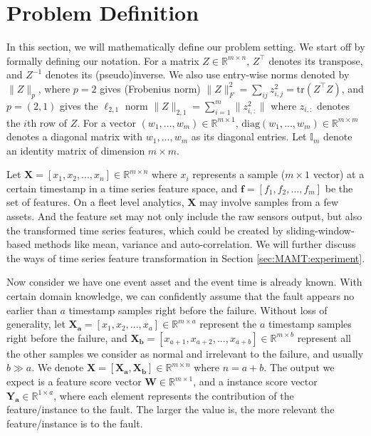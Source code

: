 \section{Problem Definition}
\label{sec:MAMT:prb_def}

In this section, we will mathematically define our problem setting.  
We start off by formally defining our notation. 
For a matrix $Z \in \mathbb{R}^{m \times n}$, $Z^\top$ denotes its transpose, and $Z^{-1}$ denotes its (pseudo)inverse. 
We also use entry-wise norms denoted by $\|Z\|_p$, where $p=2$ gives (Frobenius norm) $\| Z \|_F^2 = \sum_{ij}z^2_{i,j} = \mathrm{tr}(Z^\top Z)$, and $p=(2,1)$ gives the $\ell_{2,1}$ norm $\|Z\|_{2,1} =  \sum_{i=1}^{m}\|z^2_{i,:}\|$ where $z_{i,:}$ denotes the $i$th row of $Z$. 
For a vector $(w_1,...,w_m) \in \mathbb{R}^{m\times1}$, $\mathrm{diag}(w_1,...,w_m) \in \mathbb{R}^{m \times m}$ denotes a diagonal matrix with $w_1,...,w_m$ as its diagonal entries. Let $\mathbb{I}_m$ denote an identity matrix of dimension $m \times m$. 


Let $\textbf{X} = [x_1, x_2, ..., x_n] \in \mathbb{R}^{m \times n}$ where $x_i$ represents a sample ($m \times 1$ vector) at a certain timestamp in a time series feature space, and $\textbf{f} = [f_1, f_2, ..., f_m]$ be the set of features.  On a fleet level analytics, $\textbf{X}$ may involve samples from a few assets. And the feature set may not only include the raw sensors output, but also the transformed time series features, which could be created by sliding-window-based methods like mean, variance and auto-correlation. We will further discuss the ways of time series feature transformation in Section \ref{sec:MAMT:experiment}. 

Now consider we have one event asset and the event time is already known. With certain domain knowledge, we can confidently assume that the fault appears no earlier than $a$ timestamp samples right before the failure.  Without loss of generality, let $\textbf{X}_\textbf{a} = [x_1, x_2, ..., x_{a}] \in \mathbb{R}^{m \times a}$ represent the $a$ timestamp samples right before the failure,  and $\textbf{X}_\textbf{b} = [x_{a+1}, x_{a+2}, ..., x_{a+b}] \in \mathbb{R}^{m \times b}$ represent all the other samples we consider as normal and irrelevant to the failure, and usually $b \gg a$. We denote $\textbf{X} = [\textbf{X}_\textbf{a}, \textbf{X}_\textbf{b}] \in \mathbb{R}^{m \times n}$ where $n = a+b$. The output we expect is a feature score vector $\textbf{W} \in \mathbb{R}^{m \times 1}$, and a instance score vector $\textbf{Y}_\textbf{a} \in \mathbb{R}^{1 \times a}$, where each element represents the contribution of the feature/instance to the fault. The larger the value is, the more relevant the feature/instance is to the fault.   




